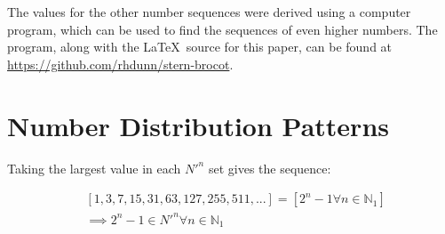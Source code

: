 \documentclass{article}
\begin{document}
\noindent
The values for the other number sequences were derived using a computer
program, which can be used to find the sequences of even higher numbers.
The program, along with the \LaTeX\ source for this paper, can be found at
\url{https://github.com/rhdunn/stern-brocot}.

\section{Number Distribution Patterns}

Taking the largest value in each \begin{math}N'^n\end{math} set gives the
sequence:

\begin{displaymath}\begin{aligned}
& [1, 3, 7, 15, 31, 63, 127, 255, 511, ...] = [2^n-1 \forall n \in \mathbb{N}_{1}] \\
& \implies 2^n-1 \in N'^n \forall n \in \mathbb{N}_{1}
\end{aligned}\end{displaymath}
\end{document}

